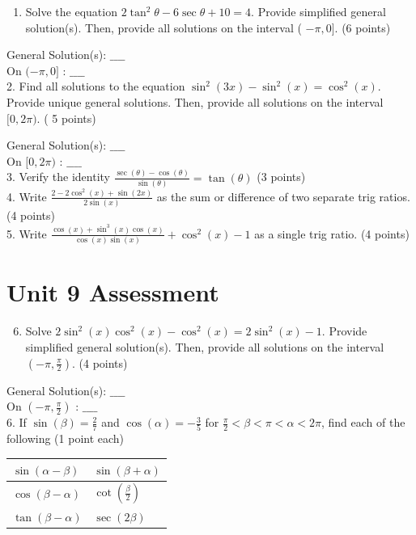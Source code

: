 \documentclass[10pt]{article}
\begin{document}
\begin{enumerate}
  \item Solve the equation $2 \tan ^{2} \theta-6 \sec \theta+10=4$. Provide simplified general solution(s). Then, provide all solutions on the interval ( $-\pi, 0]$. (6 points)
\end{enumerate}

General Solution(s): $\_\_\_\_$\\
On $(-\pi, 0]$ : $\_\_\_\_$\\
2. Find all solutions to the equation $\sin ^{2}(3 x)-\sin ^{2}(x)=\cos ^{2}(x)$. Provide unique general solutions. Then, provide all solutions on the interval $[0,2 \pi)$. ( 5 points)

General Solution(s): $\_\_\_\_$\\
On $[0,2 \pi)$ : $\_\_\_\_$\\
3. Verify the identity $\frac{\sec (\theta)-\cos (\theta)}{\sin (\theta)}=\tan (\theta)$ (3 points)\\
4. Write $\frac{2-2 \cos ^{2}(x)+\sin (2 x)}{2 \sin (x)}$ as the sum or difference of two separate trig ratios. (4 points)\\
5. Write $\frac{\cos (x)+\sin ^{3}(x) \cos (x)}{\cos (x) \sin (x)}+\cos ^{2}(x)-1$ as a single trig ratio. (4 points)

\section*{Unit 9 Assessment}
\begin{enumerate}
  \setcounter{enumi}{5}
  \item Solve $2 \sin ^{2}(x) \cos ^{2}(x)-\cos ^{2}(x)=2 \sin ^{2}(x)-1$. Provide simplified general solution(s). Then, provide all solutions on the interval $\left(-\pi, \frac{\pi}{2}\right)$. (4 points)
\end{enumerate}

General Solution(s): $\_\_\_\_$\\
On $\left(-\pi, \frac{\pi}{2}\right)$ : $\_\_\_\_$\\
6. If $\sin (\beta)=\frac{2}{7}$ and $\cos (\alpha)=-\frac{3}{5}$ for $\frac{\pi}{2}<\beta<\pi<\alpha<2 \pi$, find each of the following (1 point each)

\begin{center}
\begin{tabular}{|l|l|}
\hline
$\sin (\alpha-\beta)$ & $\sin (\beta+\alpha)$ \\
\hline
$\cos (\beta-\alpha)$ & $\cot \left(\frac{\beta}{2}\right)$ \\
\hline
$\tan (\beta-\alpha)$ & $\sec (2 \beta)$ \\
\hline
\end{tabular}
\end{center}
\end{document}
